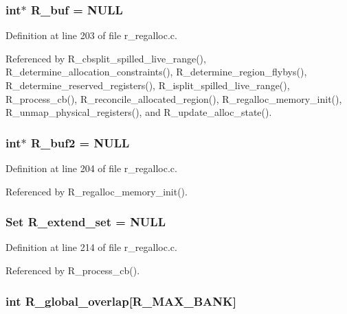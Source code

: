 \subsubsection{\setlength{\rightskip}{0pt plus 5cm}int$\ast$ \bf{R\_\-buf} = \bf{NULL}}\label{r__regalloc_8c_b943b8403b8be5f723edae80d2e8201b}




Definition at line 203 of file r\_\-regalloc.c.

Referenced by R\_\-cbsplit\_\-spilled\_\-live\_\-range(), R\_\-determine\_\-allocation\_\-constraints(), R\_\-determine\_\-region\_\-flybys(), R\_\-determine\_\-reserved\_\-registers(), R\_\-isplit\_\-spilled\_\-live\_\-range(), R\_\-process\_\-cb(), R\_\-reconcile\_\-allocated\_\-region(), R\_\-regalloc\_\-memory\_\-init(), R\_\-unmap\_\-physical\_\-registers(), and R\_\-update\_\-alloc\_\-state().
\subsubsection{\setlength{\rightskip}{0pt plus 5cm}int$\ast$ \bf{R\_\-buf2} = \bf{NULL}}\label{r__regalloc_8c_381cd998a24acd64ba259059d37582c5}




Definition at line 204 of file r\_\-regalloc.c.

Referenced by R\_\-regalloc\_\-memory\_\-init().
\subsubsection{\setlength{\rightskip}{0pt plus 5cm}\bf{Set} \bf{R\_\-extend\_\-set} = \bf{NULL}}\label{r__regalloc_8c_ade049182da7d68323ab03a427441c74}




Definition at line 214 of file r\_\-regalloc.c.

Referenced by R\_\-process\_\-cb().
\subsubsection{\setlength{\rightskip}{0pt plus 5cm}int \bf{R\_\-global\_\-overlap}[R\_\-MAX\_\-BANK]}\label{r__regalloc_8c_77bb074b57a3da884f01cd0b7cac922f}




